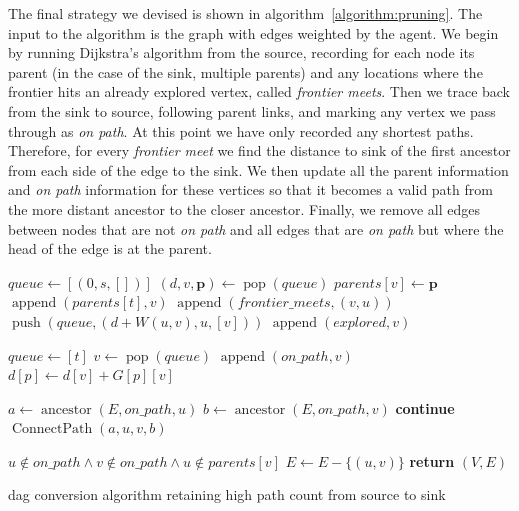 The final strategy we devised is shown in algorithm~\ref{algorithm:pruning}. The input to the algorithm is the graph with edges weighted by the agent. We begin by running Dijkstra's algorithm from the source, recording for each node its parent (in the case of the sink, multiple parents) and any locations where the frontier hits an already explored vertex, called \emph{frontier meets}. Then we trace back from the sink to source, following parent links, and marking any vertex we pass through as \emph{on path}. At this point we have only recorded any shortest paths. Therefore, for every \emph{frontier meet} we find the distance to sink of the first ancestor from each side of the edge to the sink. We then update all the parent information and \emph{on path} information for these vertices so that it becomes a valid path from the more distant ancestor to the closer ancestor. Finally, we remove all edges between nodes that are not \emph{on path} and all edges that are \emph{on path} but where the head of the edge is at the parent.

\begin{algorithm}[t]
\small
\begin{algorithmic}
  \State $queue \gets [(0, s, [])]$
    \State $(d, v, \bm{p}) \gets \operatorname{pop}(queue)$
    \State $parents[v] \gets \bm{p}$
        \State $\operatorname{append}(parents[t], v)$
        \State $\operatorname{append}(frontier\_meets, (v, u))$
      \Else
        \State $\operatorname{push}(queue, (d + W(u,v), u, [v]))$
      \EndIf
    \EndFor
    \State $\operatorname{append}(explored, v)$
  \EndWhile

  \State $queue \gets [t]$
    \State $v \gets \operatorname{pop}(queue)$
    \State $\operatorname{append}(on\_path, v)$
      \State $d[p] \gets d[v] + G[p][v]$
    \EndFor
  \EndWhile

    \State $a \gets \operatorname{ancestor}(E, on\_path, u)$
    \State $b \gets \operatorname{ancestor}(E, on\_path, v)$
      \State \textbf{continue}
    \EndIf
    \State $\operatorname{ConnectPath}(a, u, v, b)$
  \EndFor

    \If $u \notin on\_path \wedge v \notin on\_path \wedge u \notin parents[v]$
      \State $E \gets E - \{(u, v)\}$
    \EndIf
  \EndFor
  \State \textbf{return} $(V, E)$
\EndFunction
\end{algorithmic}
\caption{\ac{dag} conversion algorithm retaining high path count from source to sink}
\label{algorithm:pruning}
\end{algorithm}

